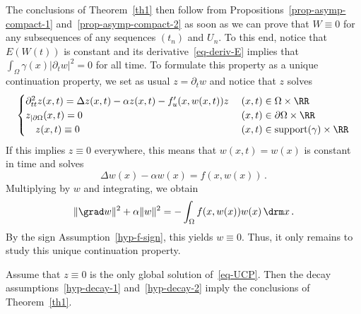 The conclusions of Theorem~\ref{th1} then follow from Propositions~\ref{prop-asymp-compact-1} and~\ref{prop-asymp-compact-2} as soon as we can prove that $W\equiv 0$ for any subsequences of any sequences $(t_n)$ and $U_n$. To this end, notice that $E(W(t))$ is constant and its derivative~\eqref{eq-deriv-E} implies that $\int_\Omega \gamma(x) |\partial_t w|^2=0$ for all time. To formulate this property as a unique continuation property, we set as usual $z=\partial_t w$ and notice that $z$ solves
\begin{equation}\label{eq-UCP}
\begin{cases}
\partial_{tt}^2 z(x,t) = \Delta z(x,t) - \alpha z(x,t) - f'_u(x,w(x,t)) z\;&(x,t)\in\Omega\times\RR\\
z_{|\partial\Omega}(x,t)=0&(x,t)\in\partial\Omega\times \RR\\
\quad z(x,t)\equiv 0 & (x,t)\in \text{support}(\gamma)\times \RR
\end{cases}
\end{equation}
If this implies $z\equiv 0$ everywhere, this means that $w(x,t)=w(x)$ is constant in time and solves
\[
\Delta w(x)-\alpha w(x)=f(x,w(x))\,.
\]
Multiplying by $w$ and integrating, we obtain
\[
\|\grad w\|^2 +\alpha \|w\|^2 = -\int_\Omega f(x,w(x))w(x)\,\drm x\,.
\]
By the sign Assumption~\eqref{hyp-f-sign}, this yields $w\equiv 0$. Thus, it only remains to study this unique continuation property.

\begin{prop}\label{prop-UCP-implique-th}
Assume that $z\equiv 0$ is the only global solution of~\eqref{eq-UCP}. Then the decay assumptions~\eqref{hyp-decay-1} and~\eqref{hyp-decay-2} imply the conclusions of Theorem~\ref{th1}.
\end{prop}


